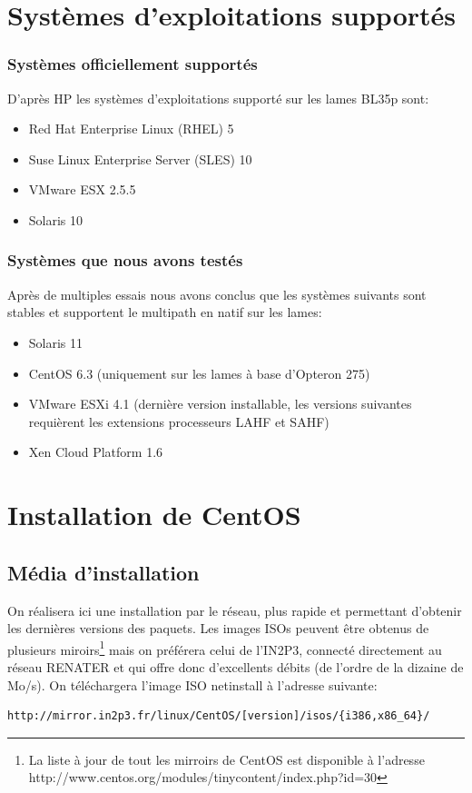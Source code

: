 \documentclass[a4paper,oneside]{report}
\begin{document}
\section{Systèmes d'exploitations supportés}
\subsubsection{Systèmes officiellement supportés}
D'après HP les systèmes d'exploitations supporté sur les lames BL35p sont:
\begin{itemize}
\item Red Hat Enterprise Linux (RHEL) 5
\item Suse Linux Enterprise Server (SLES) 10
\item VMware ESX 2.5.5
\item Solaris 10
\end{itemize}

\subsubsection{Systèmes que nous avons testés}
Après de multiples essais nous avons conclus que les systèmes suivants sont stables et supportent le multipath en natif sur les lames:
\begin{itemize}
\item Solaris 11
\item CentOS 6.3 (uniquement sur les lames à base d'Opteron 275)
\item VMware ESXi 4.1 (dernière version installable, les versions suivantes requièrent les extensions processeurs LAHF et SAHF)
\item Xen Cloud Platform 1.6
\end{itemize}

\section{Installation de CentOS}
\subsection{Média d'installation} \label{sec:installmediacentos}
On réalisera ici une installation par le réseau, plus rapide et permettant d'obtenir les dernières versions des paquets.
Les images ISOs peuvent être obtenus de plusieurs miroirs\footnote{La liste à jour de tout les mirroirs de CentOS est disponible à l'adresse http://www.centos.org/modules/tinycontent/index.php?id=30} mais on préférera celui de l'IN2P3, connecté directement au réseau RENATER et qui offre donc d'excellents débits (de l'ordre de la dizaine de Mo/s).\newline
On téléchargera l'image ISO netinstall à l'adresse suivante:
\begin{verbatim}
http://mirror.in2p3.fr/linux/CentOS/[version]/isos/{i386,x86_64}/
\end{verbatim}
\end{document}
